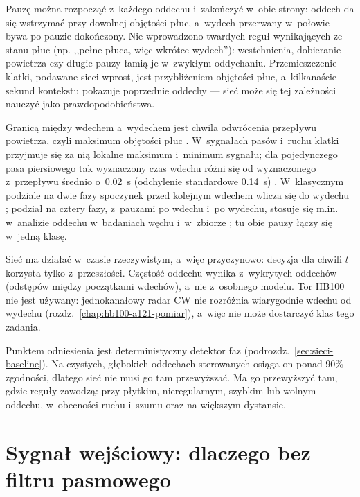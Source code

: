 \documentclass[12pt,a4paper,oneside]{report}
\begin{document}
Pauzę można rozpocząć z~każdego oddechu i~zakończyć w~obie strony: oddech da się
wstrzymać przy dowolnej objętości płuc, a~wydech przerwany w~połowie bywa po
pauzie dokończony. Nie wprowadzono twardych reguł wynikających ze stanu płuc (np.
,,pełne płuca, więc wkrótce wydech''): westchnienia, dobieranie powietrza czy
długie pauzy łamią je w~zwykłym oddychaniu. Przemieszczenie klatki, podawane
sieci wprost, jest przybliżeniem objętości płuc, a~kilkanaście sekund
kontekstu pokazuje poprzednie oddechy --- sieć może się tej zależności nauczyć
jako prawdopodobieństwa.

Granicą między wdechem a~wydechem jest chwila odwrócenia przepływu powietrza,
czyli maksimum objętości płuc \cite{bates2000}. W~sygnałach pasów i~ruchu
klatki przyjmuje się za nią lokalne maksimum i~minimum sygnału; dla
pojedynczego pasa piersiowego tak wyznaczony czas wdechu różni się od
wyznaczonego z~przepływu średnio o~\SI{0.02}{s} (odchylenie standardowe
\SI{0.14}{s}) \cite{retory2016}. W~klasycznym podziale na dwie fazy
spoczynek przed kolejnym wdechem wlicza się do wydechu \cite{bates2000};
podział na cztery fazy, z~pauzami po wdechu i~po wydechu, stosuje się m.in.
w~analizie oddechu w~badaniach węchu \cite{noto2018} i~w~zbiorze
\cite{szymanski2025}; tu obie pauzy łączy się w~jedną klasę.

Sieć ma działać w~czasie rzeczywistym, a~więc przyczynowo: decyzja dla chwili
$t$ korzysta tylko z~przeszłości. Częstość oddechu wynika z~wykrytych
oddechów (odstępów między początkami wdechów), a~nie z~osobnego modelu. Tor
HB100 nie jest używany: jednokanałowy radar CW nie rozróżnia wiarygodnie
wdechu od wydechu (rozdz.~\ref{chap:hb100-a121-pomiar}), a~więc nie może
dostarczyć klas tego zadania.

Punktem odniesienia jest deterministyczny detektor faz
(podrozdz.~\ref{sec:sieci-baseline}). Na czystych, głębokich oddechach
sterowanych osiąga on ponad 90\% zgodności, dlatego sieć nie musi go tam
przewyższać. Ma go przewyższyć tam, gdzie reguły zawodzą: przy płytkim,
nieregularnym, szybkim lub wolnym oddechu, w~obecności ruchu i~szumu oraz na
większym dystansie.

\section{Sygnał wejściowy: dlaczego bez filtru pasmowego}
\label{sec:sieci-wejscie}
\end{document}
